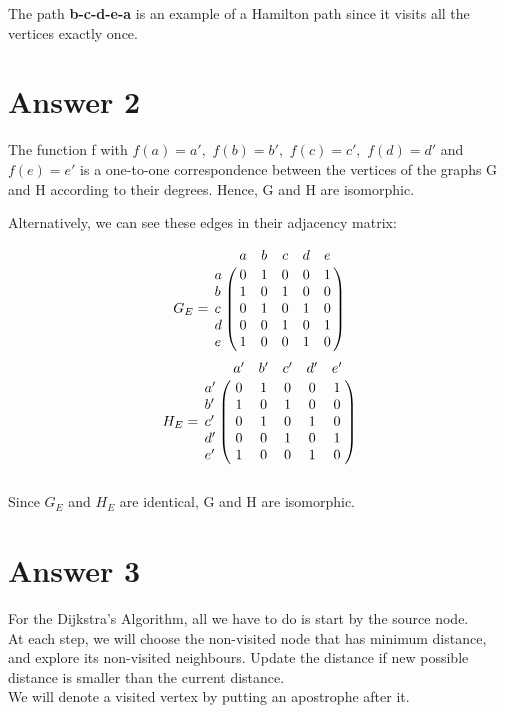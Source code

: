 \documentclass[12pt]{article}
\begin{document}
The path \textbf{b-c-d-e-a} is an example of a Hamilton path since it visits all the vertices exactly once. 

\section*{Answer 2}

The function f with $f(a) = a',$ $f (b) = b',$ $f (c) = c',$ $f(d) = d'$ and $f(e) = e'$ is a one-to-one correspondence between the vertices of the graphs G and H according to their degrees. Hence, G and H are isomorphic.

Alternatively,  we can see these edges in their adjacency matrix:

\begin{equation}
\begin{matrix} 
G_E = 
\end{matrix}\,
\bordermatrix{     
    & a&b&c&d&e\cr
    a&0&1&0&0&1\cr
    b&1&0&1&0&0\cr
    c&0&1&0&1&0\cr
    d&0&0&1&0&1\cr
    e&1&0&0&1&0\cr
}
\end{equation}
\begin{equation}
\begin{matrix} 
H_E = 
\end{matrix}\,
\bordermatrix{     
    & a'&b'&c'&d'&e'\cr
    a'&0&1&0&0&1\cr
    b'&1&0&1&0&0\cr
    c'&0&1&0&1&0\cr
    d'&0&0&1&0&1\cr
    e'&1&0&0&1&0\cr
}
\end{equation}
\\Since $G_E$ and $H_E$ are identical, G and H are isomorphic.

\section*{Answer 3}

For the Dijkstra's Algorithm, all we have to do is start by the source node. \\

At each step, we will choose the non-visited node that has minimum distance, and explore its non-visited neighbours. Update the distance if new possible distance is smaller than the current distance.\\

We will denote a visited vertex by putting an apostrophe after it.\\
\end{document}

